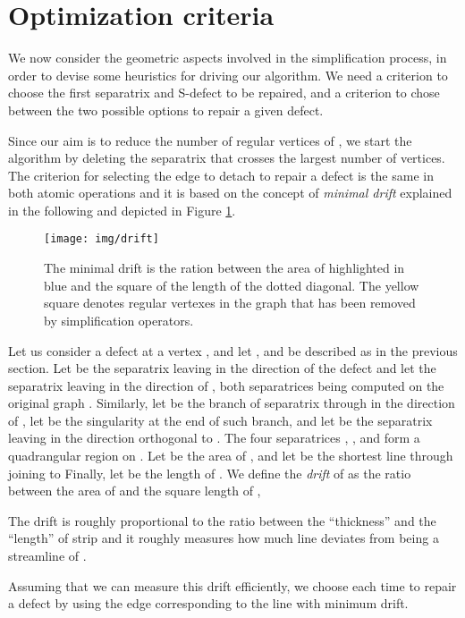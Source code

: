 \documentclass[11pt,a4paper]{article}
\begin{document}
\section{Optimization criteria}
\label{sec:optimize}
We now consider the geometric aspects involved in the simplification process, in order to devise some heuristics for driving our algorithm.
We need a criterion to choose the first separatrix and S-defect to be repaired, and a criterion to chose between the two possible options to repair a given defect.

Since our aim is to reduce the number of regular vertices of , we start the algorithm by deleting the separatrix that crosses the largest number of vertices. 
The criterion for selecting the edge to detach to repair a defect is the same in both atomic operations and it is based on the concept of \emph{minimal drift} explained in the following and depicted in Figure \ref{fig:drift}. 

\begin{figure}
\centering
\mbox{}
\hfill
\centerline{\texttt{[image: img/drift]}}


\hfill\mbox{}
\caption{\label{fig:drift} The minimal drift is the ration between the area of highlighted in blue and the square of the length of the dotted diagonal. The yellow square denotes regular vertexes in the graph that has been removed by simplification operators.
}
\end{figure}


Let us consider a defect at a vertex , and let ,  and  be described as in the previous section.
Let  be the separatrix leaving  in the direction of the defect and let  the separatrix leaving  in the direction of , both separatrices being computed on the original graph .
Similarly, let   be the branch of separatrix through  in the direction of , let  be the singularity at the end of such branch, and let  be the separatrix leaving  in the direction orthogonal to .
The four separatrices ,   ,  and  form a quadrangular region  on .
Let  be the area of , and let  be the shortest line through  joining  to 
Finally, let  be the length of .
We define the {\em drift} of  as the ratio between the area of  and the square length of ,
 
The drift is roughly proportional to the ratio between the ``thickness'' and the ``length'' of strip  and it roughly measures how much line  deviates from being a streamline of . 

Assuming that we can measure this drift efficiently, we choose each time to repair a defect by using the edge corresponding to the line with minimum drift. 
\end{document}
